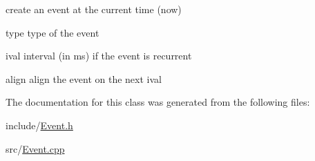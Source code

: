create an event at the current time (now) 

\begin{DoxyItemize}
\item {\ttfamily type} type of the event \item {\ttfamily ival} interval (in ms) if the event is recurrent \item {\ttfamily align} align the event on the next ival \end{DoxyItemize}


The documentation for this class was generated from the following files\+:\begin{DoxyCompactItemize}
\item 
include/\hyperlink{Event_8h}{Event.\+h}\item 
src/\hyperlink{Event_8cpp}{Event.\+cpp}\end{DoxyCompactItemize}
